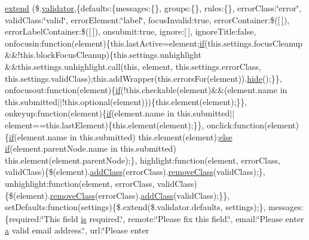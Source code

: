 \begin{DoxyCompactItemize}
\hyperlink{_bibabook_2_scripts_2jquery_8validate-vsdoc_8js_a7f3cff8052d86204c557fc71867b777c}{extend} (\$.\hyperlink{packages_2j_query_8_validation_81_811_81_2_content_2_scripts_2jquery_8validate_8js_a2dc8272bb221cdffcccbd20db038f172}{validator},\{defaults\+:\{messages\+:\{\}, groups\+:\{\}, rules\+:\{\}, error\+Class\+:\char`\"{}error\char`\"{}, valid\+Class\+:\char`\"{}valid\char`\"{}, error\+Element\+:\char`\"{}label\char`\"{}, focus\+Invalid\+:true, error\+Container\+:\$(\mbox{[}$\,$\mbox{]}), error\+Label\+Container\+:\$(\mbox{[}$\,$\mbox{]}), onsubmit\+:true, ignore\+:\mbox{[}$\,$\mbox{]}, ignore\+Title\+:false, onfocusin\+:function(element)\{this.\+last\+Active=element;\hyperlink{packages_2_respond_81_82_80_2content_2_scripts_2respond_8min_8js_a93851d60dd037a83509a1757b9ee7b66}{if}(this.\+settings.\+focus\+Cleanup \&\&!this.\+block\+Focus\+Cleanup)\{this.\+settings.\+unhighlight \&\&this.\+settings.\+unhighlight.\+call(this, element, this.\+settings.\+error\+Class, this.\+settings.\+valid\+Class);this.\+add\+Wrapper(this.\+errors\+For(element)).\hyperlink{jquery-1_810_82-vsdoc_8js_ab184a969b4c8542290dae744d90fd4d2}{hide}();\}\}, onfocusout\+:function(element)\{\hyperlink{packages_2_respond_81_82_80_2content_2_scripts_2respond_8min_8js_a93851d60dd037a83509a1757b9ee7b66}{if}(!this.\+checkable(element)\&\&(element.\+name in this.\+submitted$\vert$$\vert$!this.\+optional(element)))\{this.\+element(element);\}\}, onkeyup\+:function(element)\{\hyperlink{packages_2_respond_81_82_80_2content_2_scripts_2respond_8min_8js_a93851d60dd037a83509a1757b9ee7b66}{if}(element.\+name in this.\+submitted$\vert$$\vert$element==this.\+last\+Element)\{this.\+element(element);\}\}, onclick\+:function(element)\{\hyperlink{packages_2_respond_81_82_80_2content_2_scripts_2respond_8min_8js_a93851d60dd037a83509a1757b9ee7b66}{if}(element.\+name in this.\+submitted) this.\+element(element);\hyperlink{packages_2j_query_8_validation_81_811_81_2_content_2_scripts_2jquery_8validate_8js_a0544c3fe466e421738dae463968b70ba}{else} \hyperlink{packages_2_respond_81_82_80_2content_2_scripts_2respond_8min_8js_a93851d60dd037a83509a1757b9ee7b66}{if}(element.\+parent\+Node.\+name in this.\+submitted) this.\+element(element.\+parent\+Node);\}, highlight\+:function(element, error\+Class, valid\+Class)\{\$(element).\hyperlink{jquery-1_810_82-vsdoc_8js_ac98f6924e42def59f1eb8d3ea1892a8e}{add\+Class}(error\+Class).\hyperlink{jquery-1_810_82-vsdoc_8js_a7cb7158f409485c170580c2afea3e234}{remove\+Class}(valid\+Class);\}, unhighlight\+:function(element, error\+Class, valid\+Class)\{\$(element).\hyperlink{jquery-1_810_82-vsdoc_8js_a7cb7158f409485c170580c2afea3e234}{remove\+Class}(error\+Class).\hyperlink{jquery-1_810_82-vsdoc_8js_ac98f6924e42def59f1eb8d3ea1892a8e}{add\+Class}(valid\+Class);\}\}, set\+Defaults\+:function(settings)\{\$.extend(\$.validator.\+defaults, settings);\}, messages\+:\{required\+:\char`\"{}This field \hyperlink{jquery-1_810_82-vsdoc_8js_ab09af0fb8923d70813f6d128591d1962}{is} required.\char`\"{}, remote\+:\char`\"{}Please fix this field.\char`\"{}, email\+:\char`\"{}Please enter \hyperlink{packages_2bootstrap_83_80_80_2content_2_scripts_2bootstrap_8min_8js_a7318f59fb86a4437995ee89c780c51ac}{a} valid email address.\char`\"{}, url\+:\char`\"{}Please enter 
\end{DoxyCompactItemize}
